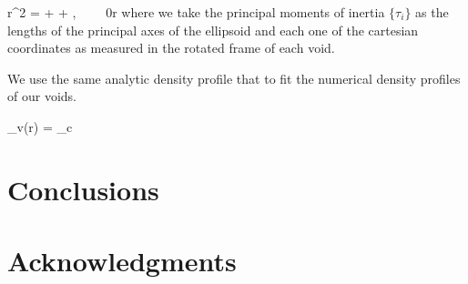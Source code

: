 \documentclass[a4,useAMS,usenatbib,usegraphicx]{latex/mn2e}
\begin{document}
{
r^2 =  +  + ,
\ \ \ \ 0\leq r 
}
where we take the principal moments of inertia $\{\tau_i \}$ as the 
lengths of the principal axes of the ellipsoid and each one of the 
cartesian coordinates as measured in the rotated frame of each void.


We use the same analytic density profile that \SRKED{[Hamaous, et.al 2014]} 
to fit the numerical density profiles of our voids.


{
\delta_v(r) = \delta_c
}



\section{Conclusions}
\label{sec:conclusions}


\section*{Acknowledgments}  




\end{document}
